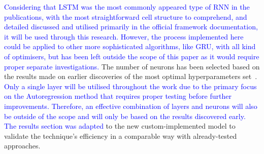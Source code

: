 {\textcolor{blue}{
Considering that LSTM was the most commonly appeared type of RNN in the publications, with the most straightforward cell structure to comprehend, and detailed discussed and utilised primarily in the official framework documentation, it will be used through this research.
However, the process implemented here could be applied to other more sophisticated algorithms, like GRU, with all kind of optimisers, but has been left outside the scope of this paper as it would require proper separate investigations.
}
The number of neurons has been selected based on the results made on earlier discoveries of the most optimal hyperparameters set~\cite{sadykov_practical_2022}.
\textcolor{blue}{Only a single layer will be utilised throughout the work due to the primary focus on the Autoregression method that requires proper testing before further improvements.
Therefore, an effective combination of layers and neurons will also be outside of the scope and will only be based on the results discovered early.
The results section was adapted} to the new custom-implemented model to validate the technique's efficiency in a comparable way with already-tested approaches.
\begin{table}[ht]
    \renewcommand{\arraystretch}{1.3}
    \caption{Model structure and parameters}
    \centering
    \label{tab:params}
\end{table}
}

